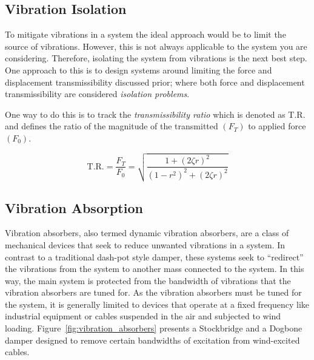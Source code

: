 \documentclass[12pt,letter]{article}
\begin{document}
\subsection{Vibration Isolation}



To mitigate vibrations in a system the ideal approach would be to limit the source of vibrations. However, this is not always applicable to the system you are considering. Therefore, isolating the system from vibrations is the next best step. One approach to this is to design systems around limiting the force and displacement transmissibility discussed prior; where both force and displacement transmissibility are considered \emph{isolation problems}.

One way to do this is to track the \emph{transmissibility ratio} which is denoted as T.R. and defines the ratio of the magnitude of the transmitted $(F_T)$ to applied force $(F_0)$. 

\begin{equation}
	\text{T.R.} = \frac{F_T}{F_0} = \sqrt{\frac{1+(2 \zeta r )^2}{(1-r^2)^2+(2 \zeta r )^2}}
\end{equation}



\subsection{Vibration Absorption}

Vibration absorbers, also termed dynamic vibration absorbers, are a class of mechanical devices that seek to reduce unwanted vibrations in a system. In contrast to a traditional dash-pot style damper, these systems seek to ``redirect'' the vibrations from the system to another mass connected to the system. In this way, the main system is protected from the bandwidth of vibrations that the vibration absorbers are tuned for. As the vibration absorbers must be tuned for the system, it is generally limited to devices that operate at a fixed frequency like industrial equipment or cables suspended in the air and subjected to wind loading. Figure~\ref{fig:vibration_absorbers} presents a Stockbridge and a Dogbone damper designed to remove certain bandwidths of excitation from wind-excited cables.
\end{document}
